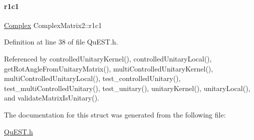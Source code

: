 \mbox{\label{structComplexMatrix2_a763007c3070802373549ba0350f83c8a}} 
\paragraph{\texorpdfstring{r1c1}{r1c1}}
{\footnotesize\ttfamily \mbox{\hyperlink{structComplex}{Complex}} Complex\+Matrix2\+::r1c1}



Definition at line 38 of file Qu\+E\+S\+T.\+h.



Referenced by controlled\+Unitary\+Kernel(), controlled\+Unitary\+Local(), get\+Rot\+Angle\+From\+Unitary\+Matrix(), multi\+Controlled\+Unitary\+Kernel(), multi\+Controlled\+Unitary\+Local(), test\+\_\+controlled\+Unitary(), test\+\_\+multi\+Controlled\+Unitary(), test\+\_\+unitary(), unitary\+Kernel(), unitary\+Local(), and validate\+Matrix\+Is\+Unitary().



The documentation for this struct was generated from the following file\+:\begin{DoxyCompactItemize}
\item 
\mbox{\hyperlink{QuEST_8h}{Qu\+E\+S\+T.\+h}}\end{DoxyCompactItemize}

